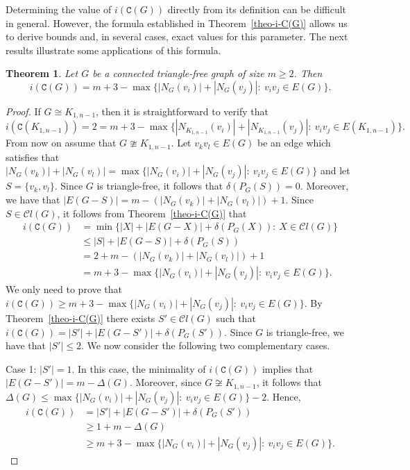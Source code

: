 \documentclass[12pt]{article}
\newtheorem{theorem}[remark]{Theorem}
\begin{document}
\noindent
Determining the value of $i (\mathtt{C}(G))$ directly from its definition can be difficult in general. However, the formula established in Theorem~\ref{theo-i-C(G)} allows us to derive bounds and, in several cases, exact values for this parameter. The next results illustrate some applications of this formula.

\begin{theorem}\label{theo-triangle-free}
Let $G$ be a connected triangle-free graph of size $m\geq 2$. Then
$$i(\mathtt{C}(G)) = m+3 - \max \{|N_G(v_i)| + |N_G(v_j)|:\ v_iv_j \in E(G)\}.$$
\end{theorem}
	
\begin{proof}
If $G \cong K_{1,n-1}$, then it is straightforward to verify that 
\begin{equation*}
i(\mathtt{C}(K_{1,n-1})) = 2 = m + 3  - \max \{|N_{K_{1,n-1}}(v_i)| + |N_{K_{1,n-1}}(v_j)|:\ v_iv_j \in E(K_{1,n-1})\}.
\end{equation*}
From now on assume that $G \ncong K_{1,n-1}$. Let $v_kv_l\in E(G)$ be an edge which satisfies that $|N_G(v_k)|+ |N_G (v_l)| = \max \{|N_G(v_i)| + |N_G(v_j)|:\ v_iv_j \in E(G)\}$ and let $S = \{v_k,v_l\}$. Since $G$ is triangle-free, it follows that $\delta(P_{G}(S)) = 0$. Moreover, we have that $|E(G-S)| = m - (|N_G(v_k)| + |N_G (v_l)|) + 1$. Since $S\in \mathcal{C}l(G)$, it follows from Theorem~\ref{theo-i-C(G)} that
\begin{equation*}
\begin{split}
i(\mathtt{C}(G)) &= \min \{ |X| + |E(G-X)| + \delta(P_{G}(X)) :\ X\in \mathcal{C}l(G)\} \\[4pt]
&\leq |S| + |E(G-S)| + \delta(P_{G}(S)) \\[4pt]
&= 2+m-   (|N_G(v_k)| + |N_G (v_l)|)+1 \\[4pt]
&= m+3 - \max \{|N_G(v_i)| + |N_G(v_j)|:\ v_iv_j \in E(G)\}.
\end{split}
\end{equation*}
We only need to prove that $i(\mathtt{C}(G)) \geq m+3 - \max \{|N_G(v_i)| + |N_G(v_j)|:\ v_iv_j \in E(G)\}$. By Theorem~\ref{theo-i-C(G)} there exists $S' \in \mathcal{C}l(G)$ such that $i(\mathtt{C}(G)) = |S'| + |E(G-S')| + \delta(P_{G}(S'))$. Since $G$ is triangle-free, we have that $|S'| \leq 2$. We now consider the following two complementary cases.

\vspace{.2cm}

\noindent
Case 1: $|S'| = 1$. In this case, the minimality of $i(\mathtt{C}(G))$ implies that $|E(G-S')| = m - \Delta(G)$. Moreover, since $G\not\cong K_{1,n-1}$, it follows that $\Delta(G)\leq \max \{|N_G(v_i)| + |N_G(v_j)|:\ v_iv_j \in E(G)\}-2$. Hence, 
\begin{equation*}
\begin{split} 
i(\mathtt{C}(G)) &= |S'| + |E(G-S')| + \delta(P_{G}(S')) \\[4pt]
&\geq 1 + m-\Delta(G) \\[4pt]
&\geq m + 3 - \max \{|N_G(v_i)| + |N_G(v_j)|:\ v_iv_j \in E(G)\}.
\end{split}
\end{equation*}


\end{proof}
\end{document}
